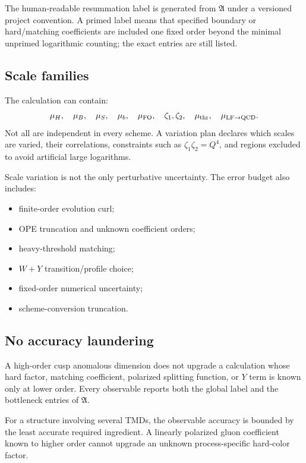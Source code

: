 \documentclass[11pt]{article}
\newcommand{\LF}{\mathrm{LF}}
\newcommand{\QCD}{\mathrm{QCD}}
\newcommand{\FO}{\mathrm{FO}}
\begin{document}
The human-readable resummation label is generated from \(\mathfrak A\) under
a versioned project convention.  A primed label means that specified boundary
or hard/matching coefficients are included one fixed order beyond the minimal
unprimed logarithmic counting; the exact entries are still listed.

\subsection{Scale families}

The calculation can contain:
\begin{equation}
 \mu_H,\quad
 \mu_B,\quad
 \mu_S,\quad
 \mu_b,\quad
 \mu_{\FO},\quad
 \zeta_1,\zeta_2,\quad
 \mu_{\rm thr},\quad
 \mu_{\LF\to\QCD}.
 \label{eq:scale-family}
\end{equation}
Not all are independent in every scheme.  A variation plan declares which
scales are varied, their correlations, constraints such as
\(\zeta_1\zeta_2=Q^4\), and regions excluded to avoid artificial large
logarithms.

Scale variation is not the only perturbative uncertainty.  The error budget
also includes:
\begin{itemize}
\item finite-order evolution curl;
\item OPE truncation and unknown coefficient orders;
\item heavy-threshold matching;
\item \(W+Y\) transition/profile choice;
\item fixed-order numerical uncertainty;
\item scheme-conversion truncation.
\end{itemize}

\subsection{No accuracy laundering}

A high-order cusp anomalous dimension does not upgrade a calculation whose
hard factor, matching coefficient, polarized splitting function, or \(Y\) term
is known only at lower order.  Every observable reports both the global label
and the bottleneck entries of \(\mathfrak A\).

For a structure involving several TMDs, the observable accuracy is bounded by
the least accurate required ingredient.  A linearly polarized gluon
coefficient known to higher order cannot upgrade an unknown process-specific
hard-color factor.
\end{document}
